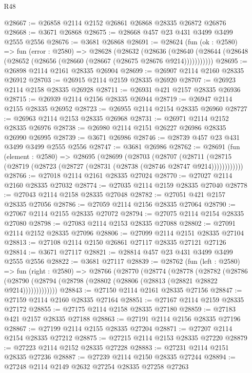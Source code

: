 \begin{lexlean}{R48}
\begin{coremodule}
@28667 := @26858 @2114 @2152 @26861 @26868 @28335 @26872 @26876
@28668 := @3671 @26868
@28675 := @28668 @457 @23 @431 @3499 @3499 @2555 @2556
@28676 := @3681 @26868
@28691 := @28624
    (fun (ok : @2580) =>
    fun (error : @2580) =>
    @28628
      (@28632
        (@28636
          (@28640 (@28644 (@28648 (@28652 (@28656 (@28660 (@28667 (@28675 @28676 @9214)))))))))))
@28695 := @26898 @2114 @2161 @28335 @26904
@28699 := @26907 @2114 @2160 @28335 @26912
@28703 := @26915 @2114 @2159 @28335 @26920
@28707 := @26923 @2114 @2158 @28335 @26928
@28711 := @26931 @421 @2157 @28335 @26936
@28715 := @26939 @2114 @2156 @28335 @26944
@28719 := @26947 @2114 @2155 @28335 @26952
@28723 := @26955 @2114 @2154 @28335 @26960
@28727 := @26963 @2114 @2153 @28335 @26968
@28731 := @26971 @2114 @2152 @28335 @26976
@28738 := @26980 @2114 @2151 @26227 @26986 @28335 @26990 @26995
@28739 := @3671 @26986
@28746 := @28739 @457 @23 @431 @3499 @3499 @2555 @2556
@28747 := @3681 @26986
@28762 := @28691
    (fun (element : @2580) =>
    @28695
      (@28699
        (@28703
          (@28707
            (@28711 (@28715 (@28719 (@28723 (@28727 (@28731 (@28738 (@28746 @28747 @9214))))))))))))
@28766 := @27018 @2114 @2161 @28335 @27024
@28770 := @27027 @2114 @2160 @28335 @27032
@28774 := @27035 @2114 @2159 @28335 @27040
@28778 := @27043 @2114 @2158 @28335 @27048
@28782 := @27051 @421 @2157 @28335 @27056
@28786 := @27059 @2114 @2156 @28335 @27064
@28790 := @27067 @2114 @2155 @28335 @27072
@28794 := @27075 @2114 @2154 @28335 @27080
@28798 := @27083 @2114 @2153 @28335 @27088
@28802 := @27091 @2114 @2152 @28335 @27096
@28806 := @27099 @2114 @2151 @28335 @27104
@28813 := @27108 @2114 @2150 @26861 @27117 @28335 @27121 @27126
@28814 := @3671 @27117
@28821 := @28814 @457 @23 @431 @3499 @3499 @2555 @2556
@28822 := @3681 @27117
@28839 := @28762
    (fun (left : @2580) =>
    fun (right : @2580) =>
    @28766
      (@28770
        (@28774
          (@28778
            (@28782
              (@28786
                (@28790 (@28794 (@28798 (@28802 (@28806 (@28813 (@28821 @28822 @9214)))))))))))))
@28843 := @27150 @2114 @2161 @28335 @27156
@28847 := @27159 @2114 @2160 @28335 @27164
@28851 := @27167 @2114 @2159 @28335 @27172
@28855 := @27175 @2114 @2158 @28335 @27180
@28859 := @27183 @421 @2157 @28335 @27188
@28863 := @27191 @2114 @2156 @28335 @27196
@28867 := @27199 @2114 @2155 @28335 @27204
@28871 := @27207 @2114 @2154 @28335 @27212
@28875 := @27215 @2114 @2153 @28335 @27220
@28879 := @27223 @2114 @2152 @28335 @27228
@28883 := @27231 @2114 @2151 @28335 @27236
@28887 := @27239 @2114 @2150 @28335 @27244
@28894 := @27248 @2114 @2149 @2632 @27254 @28335 @27258 @27263

\end{coremodule}
\end{lexlean}
